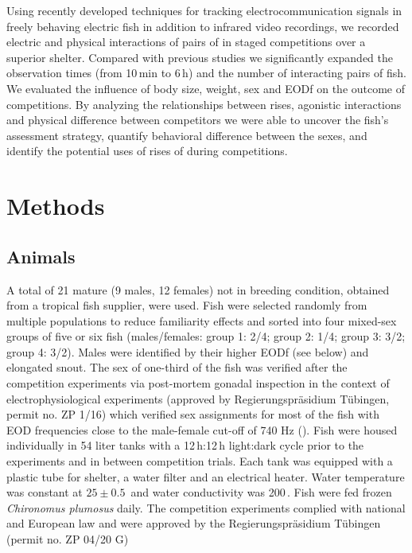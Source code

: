 Using recently developed techniques for tracking electrocommunication signals in freely behaving electric fish \citep{Henninger2018, Madhav2018, Henninger2020} in addition to infrared video recordings, we recorded electric and physical interactions of pairs of \lepto{} in staged competitions over a superior shelter. Compared with previous studies we significantly expanded the observation times (from 10\,min to 6\,h) and the number of interacting pairs of fish. We evaluated the influence of body size, weight, sex and EODf on the outcome of competitions. By analyzing the relationships between rises, agonistic interactions and physical difference between competitors we were able to uncover the fish’s assessment strategy, quantify behavioral difference between the sexes, and identify the potential uses of rises of \lepto{} during competitions.

\section{Methods}    %
\subsection{Animals}

A total of 21 mature \Lepto{} (9 males, 12 females) not in breeding condition, obtained from a tropical fish supplier, were used. Fish were selected randomly from multiple populations to reduce familiarity effects and sorted into four mixed-sex groups of five or six fish (males/females: group 1: 2/4; group 2: 1/4; group 3: 3/2; group 4: 3/2). Males were identified by their higher EODf (see below) and elongated snout. The sex of one-third of the fish was verified after the competition experiments via post-mortem gonadal inspection in the context of electrophysiological experiments (approved by Regierungspr\"asidium T\"ubingen, permit no. ZP 1/16) which verified sex assignments for most of the fish with EOD frequencies close to the male-female cut-off of 740 Hz (). Fish were housed individually in 54 liter tanks with a 12\,h:12\,h light:dark cycle prior to the experiments and in between competition trials. Each tank was equipped with a plastic tube for shelter, a water filter and an electrical heater. Water temperature was constant at $25\pm0.5$\,\celsius{} and water conductivity was 200\,\micro\siemens\per\centi\meter. Fish were fed frozen \textit{Chironomus plumosus} daily. The competition experiments complied with national and European law and were approved by the Regierungspr\"asidium T\"ubingen (permit no. ZP 04/20 G)

